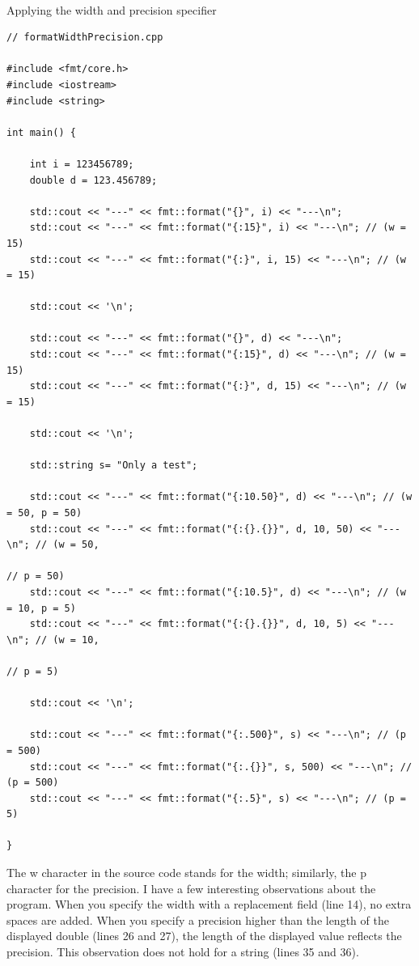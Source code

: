 \hspace*{\fill} \\ %
\noindent
Applying the width and precision specifier
\begin{lstlisting}[style=styleCXX]
// formatWidthPrecision.cpp

#include <fmt/core.h>
#include <iostream>
#include <string>

int main() {

	int i = 123456789;
	double d = 123.456789;
	
	std::cout << "---" << fmt::format("{}", i) << "---\n";
	std::cout << "---" << fmt::format("{:15}", i) << "---\n"; // (w = 15)
	std::cout << "---" << fmt::format("{:}", i, 15) << "---\n"; // (w = 15)
	
	std::cout << '\n';
	
	std::cout << "---" << fmt::format("{}", d) << "---\n";
	std::cout << "---" << fmt::format("{:15}", d) << "---\n"; // (w = 15)
	std::cout << "---" << fmt::format("{:}", d, 15) << "---\n"; // (w = 15)
	
	std::cout << '\n';
	
	std::string s= "Only a test";
	
	std::cout << "---" << fmt::format("{:10.50}", d) << "---\n"; // (w = 50, p = 50)
	std::cout << "---" << fmt::format("{:{}.{}}", d, 10, 50) << "---\n"; // (w = 50,
	                                                                     // p = 50)
	std::cout << "---" << fmt::format("{:10.5}", d) << "---\n"; // (w = 10, p = 5)
	std::cout << "---" << fmt::format("{:{}.{}}", d, 10, 5) << "---\n"; // (w = 10, 
	                                                                    // p = 5)
	
	std::cout << '\n';
	
	std::cout << "---" << fmt::format("{:.500}", s) << "---\n"; // (p = 500)
	std::cout << "---" << fmt::format("{:.{}}", s, 500) << "---\n"; // (p = 500)
	std::cout << "---" << fmt::format("{:.5}", s) << "---\n"; // (p = 5)

}
\end{lstlisting}

The w character in the source code stands for the width; similarly, the p character for the precision. I have a few interesting observations about the program. When you specify the width with a replacement field (line 14), no extra spaces are added. When you specify a precision higher than the length of the displayed double (lines 26 and 27), the length of the displayed value reflects the precision. This observation does not hold for a string (lines 35 and 36).

